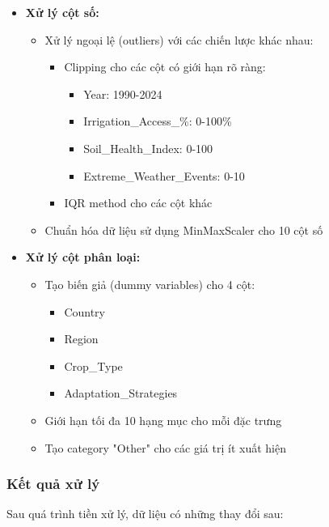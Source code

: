 \begin{itemize}
    \item \textbf{Xử lý cột số:}
    \begin{itemize}
        \item Xử lý ngoại lệ (outliers) với các chiến lược khác nhau:
        \begin{itemize}
            \item Clipping cho các cột có giới hạn rõ ràng:
            \begin{itemize}
                \item Year: 1990-2024
                \item Irrigation\_Access\_\%: 0-100\%
                \item Soil\_Health\_Index: 0-100
                \item Extreme\_Weather\_Events: 0-10
            \end{itemize}
            \item IQR method cho các cột khác
        \end{itemize}
        \item Chuẩn hóa dữ liệu sử dụng MinMaxScaler cho 10 cột số
    \end{itemize}
    
    \item \textbf{Xử lý cột phân loại:}
    \begin{itemize}
        \item Tạo biến giả (dummy variables) cho 4 cột:
        \begin{itemize}
            \item Country
            \item Region
            \item Crop\_Type
            \item Adaptation\_Strategies
        \end{itemize}
        \item Giới hạn tối đa 10 hạng mục cho mỗi đặc trưng
        \item Tạo category "Other" cho các giá trị ít xuất hiện
    \end{itemize}
\end{itemize}

\subsubsection{Kết quả xử lý}

\hspace{0.5cm}Sau quá trình tiền xử lý, dữ liệu có những thay đổi sau:

